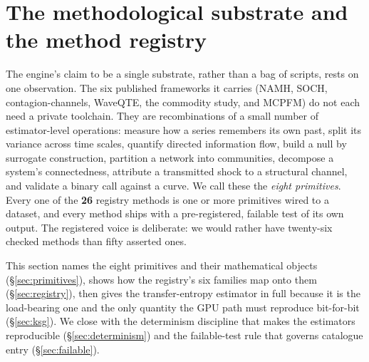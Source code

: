 \section{The methodological substrate and the method registry}
\label{sec:substrate}

The engine's claim to be a single substrate, rather than a bag of scripts, rests on
one observation. The six published frameworks it carries (NAMH, SOCH,
contagion-channels, WaveQTE, the commodity study, and MCPFM) do not each need a
private toolchain. They are recombinations of a small number of estimator-level
operations: measure how a series remembers its own past, split its variance across
time scales, quantify directed information flow, build a null by surrogate
construction, partition a network into communities, decompose a system's
connectedness, attribute a transmitted shock to a structural channel, and validate
a binary call against a curve. We call these the \emph{eight primitives}. Every one
of the \textbf{26} registry methods is one or more primitives wired to a dataset,
and every method ships with a pre-registered, failable test of its own output. The
registered voice is deliberate: we would rather have twenty-six checked methods than
fifty asserted ones.

This section names the eight primitives and their mathematical objects
(\S\ref{sec:primitives}), shows how the registry's six families map onto them
(\S\ref{sec:registry}), then gives the transfer-entropy estimator in full because it
is the load-bearing one and the only quantity the GPU path must reproduce bit-for-bit
(\S\ref{sec:ksg}). We close with the determinism discipline that makes the estimators
reproducible (\S\ref{sec:determinism}) and the failable-test rule that governs
catalogue entry (\S\ref{sec:failable}).

